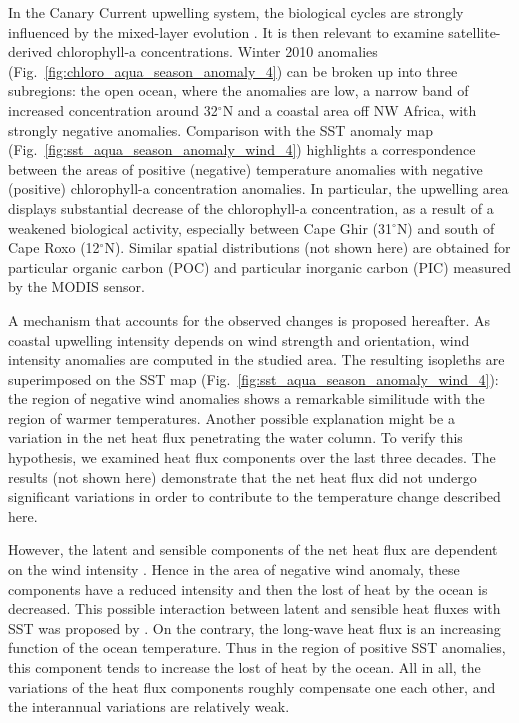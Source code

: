 \documentclass[12pt]{article}
\begin{document}
In the Canary Current upwelling system, the biological cycles are strongly influenced by the mixed-layer evolution \citep[e.g.][]{TROUPIN10}. It is then relevant to examine satellite-derived chlorophyll-a concentrations. Winter 2010 anomalies (Fig.~\ref{fig:chloro_aqua_season_anomaly_4})  can be broken up into three subregions: the open ocean, where the anomalies are low, a narrow band of increased concentration around 32$^{\circ}$N and a coastal area off NW Africa, with strongly negative anomalies. Comparison with the SST anomaly map (Fig.~\ref{fig:sst_aqua_season_anomaly_wind_4}) highlights a correspondence between the areas of positive (negative) temperature anomalies with negative (positive) chlorophyll-a concentration anomalies. In particular, the upwelling area displays substantial decrease of the chlorophyll-a concentration, as a result of a weakened biological activity, especially between Cape Ghir (31$^{\circ}$N) and south of Cape Roxo (12$^{\circ}$N). Similar spatial distributions (not shown here) are obtained for particular organic carbon (POC) and particular inorganic carbon (PIC) measured by the MODIS sensor.

A mechanism that accounts for the observed changes is proposed hereafter. As coastal upwelling intensity depends on wind strength and orientation, wind intensity anomalies are computed in the studied area. The resulting isopleths are superimposed on the SST map (Fig.~\ref{fig:sst_aqua_season_anomaly_wind_4}): the region of negative wind anomalies shows a remarkable similitude with the region of warmer temperatures. Another possible explanation might be a variation in the net heat flux penetrating the water column. To verify this hypothesis, we examined heat flux components over the last three decades. The results (not shown here) demonstrate that the net heat flux did not undergo significant variations in order to contribute to the temperature change described here. 

However, the latent and sensible components of the net heat flux are dependent on the wind intensity \citep[e.g.][]{CHARNOCK67,KONDO75,YU04}. Hence in the area of negative wind anomaly, these components have a reduced intensity and then the lost of heat by the ocean is decreased. This possible interaction between latent and sensible heat fluxes with SST was proposed by \cite{CAYAN92}. On the contrary, the long-wave heat flux is an increasing function of the ocean temperature. Thus in the region of positive SST anomalies, this component tends to increase the lost of heat by the ocean. All in all, the variations of the heat flux components roughly compensate one each other, and the interannual variations are relatively weak.
\end{document}
